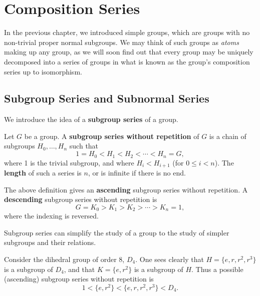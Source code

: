 \chapter{Composition Series}
In the previous chapter, we introduced simple groups, which are groups with no non-trivial proper normal subgroups. We may think of such groups as \textit{atoms} making up any group, as we will soon find out that every group may be uniquely decomposed into a series of groups in what is known as the group's composition series up to isomorphism.

\section{Subgroup Series and Subnormal Series}
We introduce the idea of a \textbf{subgroup series} of a group.
\begin{definition}
    Let $G$ be a group. A \textbf{subgroup series without repetition} of $G$ is a chain of subgroups $H_0, \dots, H_n$ such that
    \[
        1 = H_0 < H_1 < H_2 < \cdots < H_n = G,
    \]
    where 1 is the trivial subgroup, and where $H_i < H_{i+1}$ (for $0 \leq i < n$). The \textbf{length} of such a series is $n$, or is infinite if there is no end.
\end{definition}
\begin{remark}
    The above definition gives an \textbf{ascending} subgroup series without repetition. A \textbf{descending} subgroup series without repetition is
    \[
        G = K_0 > K_1 > K_2 > \cdots > K_n = 1,
    \]
    where the indexing is reversed.
\end{remark}

Subgroup series can simplify the study of a group to the study of simpler subgroups and their relations.

\begin{example}
    Consider the dihedral group of order 8, $D_4$. One sees clearly that $H = \{e, r, r^2, r^3\}$ is a subgroup of $D_4$, and that $K = \{e, r^2\}$ is a subgroup of $H$. Thus a possible (ascending) subgroup series without repetition is
    \[
        1 < \{e, r^2\} < \{e, r, r^2, r^3\} < D_4.
    \]
\end{example}

